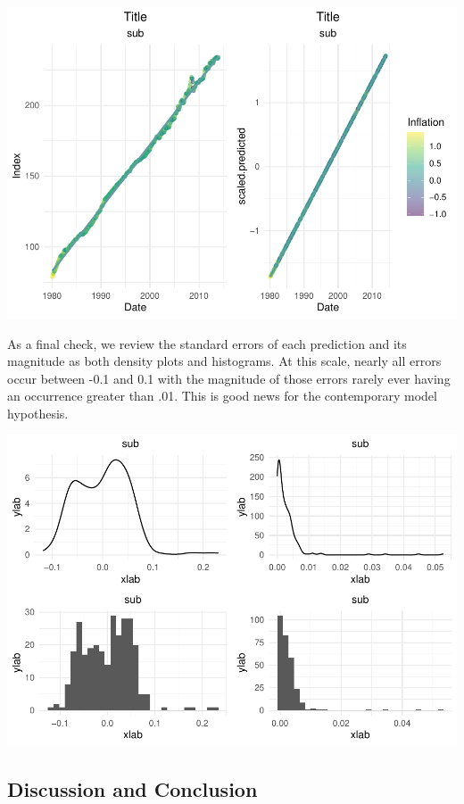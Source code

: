 \documentclass[
]{article}
\begin{document}
\includegraphics{CPIAnalysis_files/figure-latex/unnamed-chunk-12-1.pdf}

As a final check, we review the standard errors of each prediction and
its magnitude as both density plots and histograms. At this scale,
nearly all errors occur between -0.1 and 0.1 with the magnitude of those
errors rarely ever having an occurrence greater than .01. This is good
news for the contemporary model hypothesis.

\includegraphics{CPIAnalysis_files/figure-latex/unnamed-chunk-13-1.pdf}

\hypertarget{discussion-and-conclusion}{%
\subsection{Discussion and Conclusion}\label{discussion-and-conclusion}}
\end{document}
